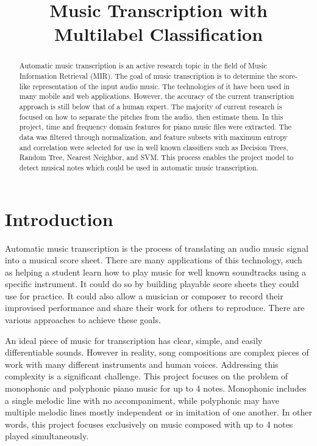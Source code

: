 \documentclass{article}
\title{Music Transcription with Multilabel Classification}
\begin{document}
%
\maketitle
%
\begin{abstract}
Automatic music transcription is an active research topic in the field of Music Information Retrieval (MIR). The goal of music transcription is to determine the score-like representation of the input audio music. The technologies of it have been used in many mobile and web applications. However, the accuracy of the current transcription approach is still below that of a human expert. The majority of current research is focused on how to separate the pitches from the audio, then estimate them. In this project, time and frequency domain features for piano music files were extracted. The data was filtered through normalization, and feature subsets with maximum entropy and correlation were selected for use in well known classifiers such as Decision Trees, Random Tree, Nearest Neighbor, and SVM. This process enables the project model to detect musical notes which could be used in automatic music transcription.
\end{abstract}
%
\section{Introduction}\label{sec:introduction}
Automatic music transcription is the process of translating an audio music signal into a musical score sheet\cite{Duan2015-nt}. There are many applications of this technology, such as helping a student learn how to play music for well known soundtracks using a specific instrument. It could do so by building playable score sheets they could use for practice. It could also allow a musician or composer to record their improvised performance\cite{Benetos2013-io} and share their work for others to reproduce. There are various approaches to achieve these goals\cite{Ming2014-cj,Lee2012-dd,Anan2012-up,Sigtia2016-sz,Poliner2005-ow}. 

An ideal piece of music for transcription has clear, simple, and easily differentiable sounds. However in reality, song compositions are complex pieces of work with many different instruments and human voices. Addressing this complexity is a significant challenge. This project focuses on the problem of monophonic and polyphonic piano music for up to 4 notes. Monophonic includes a single melodic line with no accompaniment, while polyphonic may have multiple melodic lines mostly independent or in imitation of one another. In other words, this project focuses exclusively on music composed with up to 4 notes played simultaneously.
\end{document}
